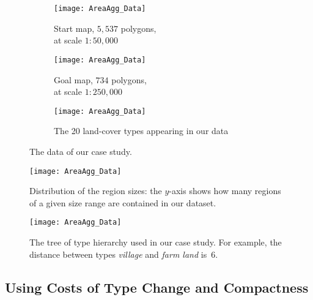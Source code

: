 \begin{figure}[tb]
\begin{subfigure}[b]{.49\textwidth}
\centering
\texttt{[image: AreaAgg\_Data]}
\caption{Start map, $5{,}537$ polygons, \\
	at scale $1:50{,}000$}
\end{subfigure}
\hfill
\begin{subfigure}[b]{.49\textwidth}
\centering
\texttt{[image: AreaAgg\_Data]}
\caption{Goal map, $734$ polygons, \\
	at scale $1:250{,}000$}
\end{subfigure}
%
\par\vspace{\baselineskip} %
%
\begin{subfigure}{\textwidth}
\centering
\texttt{[image: AreaAgg\_Data]}
\caption{The 20 land-cover types appearing in our data}
\end{subfigure}
\caption{The data of our case study.}
\label{fig:AreaAgg_Data}
\end{figure}

\begin{figure}[tb]
\centering
\texttt{[image: AreaAgg\_Data]}
\caption{Distribution of the region sizes:
	the $y$-axis shows how many regions 
	of a given size range are contained in our dataset.}
\label{fig:AreaAgg_NumRegion}
\end{figure}

\begin{figure}[tb]
\centering
\texttt{[image: AreaAgg\_Data]}
\caption{The tree of type hierarchy used in our case study.
	For example, the distance between 
	types \emph{village} and \emph{farm land} is~$6$.}
\label{fig:AreaAgg_TypeDistances}
\end{figure}

\subsection{Using Costs of Type Change and Compactness}
\label{sec:AreaAgg_CaseStudy1}

